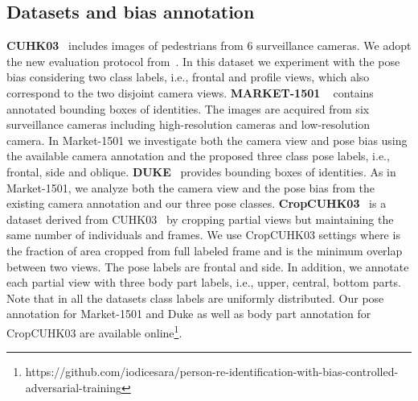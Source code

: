 \documentclass[10pt,twocolumn,letterpaper]{article}
\begin{document}
\subsection{Datasets and bias annotation}
\noindent\textbf{CUHK03}~\cite{li2014deepreid} includes  images of  pedestrians from 6 surveillance cameras. We adopt the new evaluation protocol from~\cite{zhong2017re}. In this dataset we experiment with the pose bias considering two class labels, i.e., frontal and profile views, which also correspond to the two disjoint camera views.
\newline
\noindent\textbf{MARKET-1501 }~\cite{zheng2015scalable} contains  annotated bounding boxes of  identities. The images are acquired from six surveillance cameras including  high-resolution cameras and  low-resolution camera. In Market-1501 we investigate both the camera view and pose bias using the available camera annotation and the proposed three class pose labels, i.e., frontal, side and oblique.
\newline
\noindent\textbf{DUKE}~\cite{ristani2016MTMC} provides 
bounding boxes of  identities. As in Market-1501, we analyze both the camera view and the pose bias from the existing camera annotation and our three pose classes.
\newline
\noindent\textbf{CropCUHK03}~\cite{iodice2018partial} is a  dataset derived from CUHK03~\cite{li2014deepreid} by cropping partial views but maintaining the same number of individuals and frames. 
We use CropCUHK03 settings  where  is the fraction of area cropped from full labeled frame and  is the minimum overlap between two views. The pose labels are frontal and side. In addition, we annotate each partial view with three body part labels, i.e., upper, central, bottom parts.  \newline
Note that in all the datasets class labels are uniformly distributed.
Our pose annotation for Market-1501 and Duke as well as body part annotation for CropCUHK03 are available online\footnote{https://github.com/iodicesara/person-re-identification-with-bias-controlled-adversarial-training}.
\newline
\end{document}
